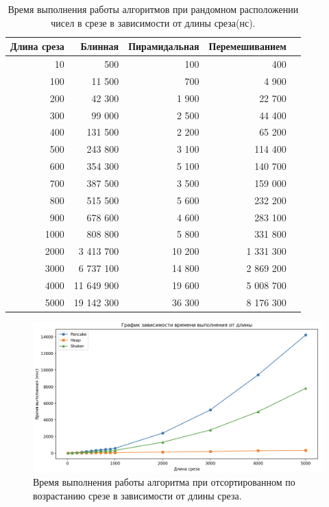 \begin{table}[!ht]
    \centering
    \caption{\label{tab:tableRand} Время выполнения работы алгоритмов при рандомном расположении чисел в срезе
    в зависимости от длины среза(нс).}
    \begin{tabular}{|r|r|r|r|r|}
    \hline
        Длина среза & Блинная & Пирамидальная & Перемешиванием  \\ \hline
        10 & 500 & 100 & 400  \\ \hline
        100 & 11 500 & 700 & 4 900  \\ \hline
        200 & 42 300 & 1 900 & 22 700  \\ \hline
        300 & 99 000 & 2 500 & 44 400  \\ \hline
        400 & 131 500 & 2 200 & 65 200  \\ \hline
        500 & 243 800 & 3 100 & 114 400  \\ \hline
        600 & 354 300 & 5 100 & 140 700  \\ \hline
        700 & 387 500 & 3 500 & 159 000  \\ \hline
        800 & 515 500 & 5 600 & 232 200  \\ \hline
        900 & 678 600 & 4 600 & 283 100  \\ \hline
        1000 & 808 800 & 5 800 & 331 800  \\ \hline
        2000 & 3 413 700 & 10 200 & 1 331 300  \\ \hline
        3000 & 6 737 100 & 14 800 & 2 869 200  \\ \hline
        4000 & 11 649 900 & 19 600 & 5 008 700  \\ \hline
        5000 & 19 142 300 & 36 300 & 8 176 300 \\ \hline
    \end{tabular}
\end{table}

\begin{figure}[h]
	\centering
	\includegraphics[height=0.35\textheight]{img/ascend.png}
	\caption{Время выполнения работы алгоритма при отсортированном по возрастанию срезе
    в зависимости от длины среза.}
	\label{img:ascend}
\end{figure}

